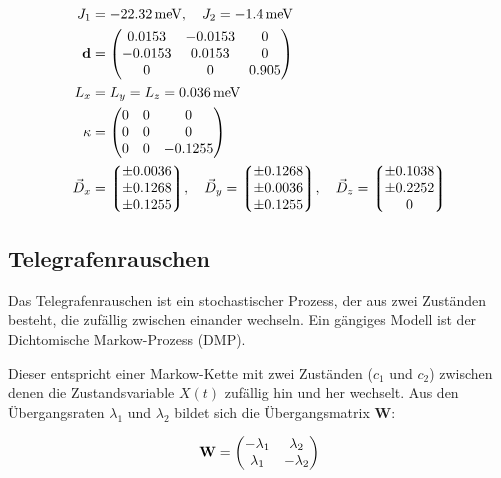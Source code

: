 \documentclass[main.tex]{subfiles}
\begin{document}
\begin{align}
	J_1             & = \SI{-22,32}{\milli\electronvolt}, \quad J_2 =
	\SI{-1,4}{\milli\electronvolt}
	\\
	\mathbf{d}      & = \mqty(
	\num{0.0153}    & \num{-0.0153}                                   & 0
	\\
	\num{-0.0153}   & \num{0.0153}                                    & 0
	\\
	0               & 0                                               &
	\num{0.905})
	\\
	L_x             & = L_y = L_z = \SI{0.036}{\milli\electronvolt}
	\\
	\mathbf{\kappa} & = \mqty(
	0               & 0                                               & 0
	\\
	0               & 0                                               & 0
	\\
	0               & 0                                               &
	\num{-0.1255})
	\\
	\vec{D}_x       & = \mqty*(\num{\pm 0.0036}
	\\ \num{\pm 0.1268} \\ \num{\pm
		0.1255}), \quad
	\vec{D}_y = \mqty*(\num{\pm 0.1268}
	\\ \num{\pm 0.0036} \\ \num{\pm
		0.1255}), \quad
	\vec{D}_z = \mqty*(\num{\pm 0.1038}
	\\ \num{\pm 0.2252} \\ 0)
\end{align}
\subsection{Telegrafenrauschen}

Das Telegrafenrauschen ist ein stochastischer Prozess, der aus zwei Zuständen
besteht, die zufällig zwischen einander wechseln. Ein gängiges Modell ist der
Dichtomische Markow-Prozess (DMP).

Dieser entspricht einer Markow-Kette mit zwei Zuständen (\(c_1\) und \(c_2\))
zwischen denen die Zustandsvariable \(X(t)\) zufällig hin und her wechselt. Aus
den Übergangsraten \(\lambda_1\) und \(\lambda_2\) bildet sich die
Übergangsmatrix \(\mathbf{W}\):

\begin{align}
	\mathbf{W} = \mqty(
	-\lambda_1 & \lambda_2   \\
	\lambda_1  & -\lambda_2)
\end{align}
\end{document}
